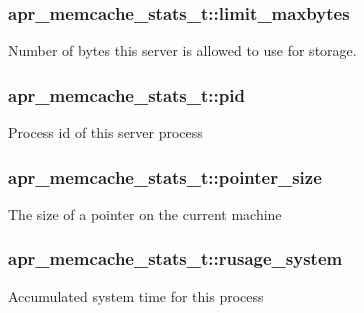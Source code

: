 \subsubsection[{\texorpdfstring{limit\+\_\+maxbytes}{limit_maxbytes}}]{ apr\+\_\+memcache\+\_\+stats\+\_\+t\+::limit\+\_\+maxbytes}\hypertarget{structapr__memcache__stats__t_afbfa184ab0898d4a897a629c935783b8}{}\label{structapr__memcache__stats__t_afbfa184ab0898d4a897a629c935783b8}
Number of bytes this server is allowed to use for storage. 
\subsubsection[{\texorpdfstring{pid}{pid}}]{ apr\+\_\+memcache\+\_\+stats\+\_\+t\+::pid}\hypertarget{structapr__memcache__stats__t_a8ed498f4a6cbfb55312b8b67ce2689d3}{}\label{structapr__memcache__stats__t_a8ed498f4a6cbfb55312b8b67ce2689d3}
Process id of this server process 
\subsubsection[{\texorpdfstring{pointer\+\_\+size}{pointer_size}}]{ apr\+\_\+memcache\+\_\+stats\+\_\+t\+::pointer\+\_\+size}\hypertarget{structapr__memcache__stats__t_a01bd7ed7ba82b7a7bf03f9de468fcc2e}{}\label{structapr__memcache__stats__t_a01bd7ed7ba82b7a7bf03f9de468fcc2e}
The size of a pointer on the current machine 
\subsubsection[{\texorpdfstring{rusage\+\_\+system}{rusage_system}}]{ apr\+\_\+memcache\+\_\+stats\+\_\+t\+::rusage\+\_\+system}\hypertarget{structapr__memcache__stats__t_a2eff9899b9cb4ee704fae93af4c5bf76}{}\label{structapr__memcache__stats__t_a2eff9899b9cb4ee704fae93af4c5bf76}
Accumulated system time for this process 
